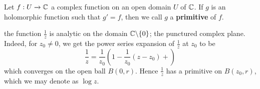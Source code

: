 \begin{definition}
    Let $f:U \xrightarrow{} \mathbb{C}$ a complex function on an open domain $U$ of
    $\mathbb{C}$. If  $g$ is an holomorphic function such that  $g'=f$, then we call
    $g$ a  \textbf{primitive} of $f$.
\end{definition}

\begin{example}\label{example_2.9}
    the function $\frac{1}{z}$ is analytic on the domain $\mathbb{C}\backslash\{0\}$; the
    punctured complex plane. Indeed, for $z_0 \neq 0$, we get the power series
    expansion of $\frac{1}{z}$ at $z_0$ to be
    \begin{equation*}
        \frac{1}{z}=\frac{1}{z_0}(1-\frac{1}{z_0}(z-z_0)+)
    \end{equation*}
    which converges on the open ball $B(0,r)$. Hence $\frac{1}{z}$ has a
    primitive on $B(z_0,r)$, which we may denote as $\log{z}$.
\end{example}
